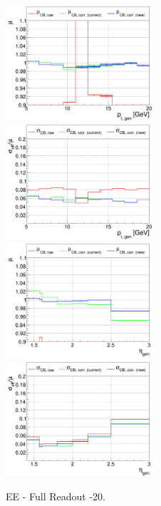 \begin{figure}
\includegraphics[width=0.495\textwidth]{./plots_pdf/ECAL_plots/plotsNoPU/EE/pdf/FULL/GENPT/EEFULL_GENPT_0005_0020_MuOverBins.pdf}
\includegraphics[width=0.495\textwidth]{./plots_pdf/ECAL_plots/plotsNoPU/EE/pdf/FULL/GENPT/EEFULL_GENPT_0005_0020_EffSigmaOverBins.pdf}
\includegraphics[width=0.495\textwidth]{./plots_pdf/ECAL_plots/plotsNoPU/EE/pdf/FULL/GENETA/EEFULL_GENETA_0005_0020_MuOverBins.pdf}
\includegraphics[width=0.495\textwidth]{./plots_pdf/ECAL_plots/plotsNoPU/EE/pdf/FULL/GENETA/EEFULL_GENETA_0005_0020_EffSigmaOverBins.pdf}
\caption{EE - Full Readout -20\GeV.}
\label{fig:NOPU_EEFULL_0005_0020}
\end{figure}


